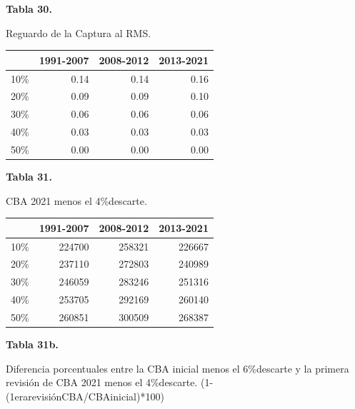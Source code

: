 \documentclass[
  spanish,
]{article}
\begin{document}
\vspace{-0.5cm}

\small
\begin{center} 
\textbf{Tabla 30.}
\end{center}
\begin{center} 
\vspace{-0.2cm} Reguardo de la Captura al RMS.
\end{center}
\vspace{-0.2cm}

\begin{longtable}[]{@{}lrrr@{}}
\toprule
& 1991-2007 & 2008-2012 & 2013-2021\tabularnewline
\midrule
\endhead
10\% & 0.14 & 0.14 & 0.16\tabularnewline
20\% & 0.09 & 0.09 & 0.10\tabularnewline
30\% & 0.06 & 0.06 & 0.06\tabularnewline
40\% & 0.03 & 0.03 & 0.03\tabularnewline
50\% & 0.00 & 0.00 & 0.00\tabularnewline
\bottomrule
\end{longtable}

\vspace{-0.5cm}

\small
\begin{center} 
\textbf{Tabla 31.}
\end{center}
\begin{center} 
\vspace{-0.2cm} CBA 2021 menos el 4\%descarte. 
\end{center}
\vspace{-0.2cm}

\begin{longtable}[]{@{}lrrr@{}}
\toprule
& 1991-2007 & 2008-2012 & 2013-2021\tabularnewline
\midrule
\endhead
10\% & 224700 & 258321 & 226667\tabularnewline
20\% & 237110 & 272803 & 240989\tabularnewline
30\% & 246059 & 283246 & 251316\tabularnewline
40\% & 253705 & 292169 & 260140\tabularnewline
50\% & 260851 & 300509 & 268387\tabularnewline
\bottomrule
\end{longtable}

\vspace{-0.5cm}

\small
\begin{center} 
\textbf{Tabla 31b.}
\end{center}
\begin{center} 
\vspace{-0.2cm} Diferencia porcentuales entre la CBA inicial menos el 6\%descarte y la primera revisión de CBA 2021 menos el 4\%descarte. (1-(1erarevisiónCBA/CBAinicial)*100)
\end{center}
\vspace{-0.2cm}
\end{document}
